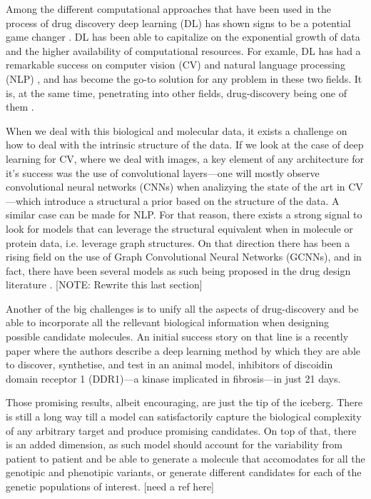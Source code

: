 \documentclass{article}
\begin{document}
Among the different computational approaches that have been used in the process of drug
 discovery deep learning (DL) has shown signs to be a potential game changer
 \cite{Dargan2019}. DL has been able to capitalize on the exponential growth of data and
 the higher availability of computational resources. For examle, DL has had a remarkable
 success on computer vision (CV) \cite{CV} and natural language processing (NLP)
 \cite{NLP}, and has become the go-to solution for any problem in these two fields. It
 is, at the same time, penetrating into other fields, drug-discovery being one of them
 \cite{Chen2018}. 

When we deal with this biological and molecular data, it exists a challenge on how to
 deal with the intrinsic structure of the data.
 If we look at the case of deep learning for CV, where we deal with images, a key
 element of any architecture for it's success was the use of convolutional layers---one
 will mostly observe convolutional neural networks (CNNs) when analizying the state of
 the art in CV---which introduce a structural a prior based on the structure of the
 data\cite{CNNs}. A similar case can be made for NLP\cite{Somethings?}. For that reason,
 there exists a strong signal to look for models that can leverage the structural
 equivalent when in molecule or protein data, i.e. leverage graph structures. On that
 direction there has been a rising field on the use of Graph Convolutional Neural
 Networks (GCNNs)\cite{Wu2019}, and in fact, there have been several models as such
 being proposed in the drug design literature \cite{Sun2019}. [NOTE: Rewrite this last
 section]

Another of the big challenges is to unify all the aspects of drug-discovery and be able
 to incorporate all the rellevant biological information when designing possible
 candidate molecules. An initial success story on that line is a recently paper
 \cite{Zhavoronkov2019} where the authors describe a deep learning method by which they
 are able to discover, synthetise, and test in an animal model, inhibitors of discoidin domain receptor 1 (DDR1)—a kinase
 implicated in fibrosis—in just 21 days.

Those promising results, albeit encouraging, are just the tip of the iceberg. There is
still a long way till a model can satisfactorily capture the biological complexity of
any arbitrary target and produce promising candidates. On top of that, there is an added
dimension, as such model should account for the variability from patient to patient and
be able to generate a molecule that accomodates for all the genotipic and phenotipic
variants, or generate different candidates for each of the genetic populations of
interest. [need a ref here]
\end{document}
